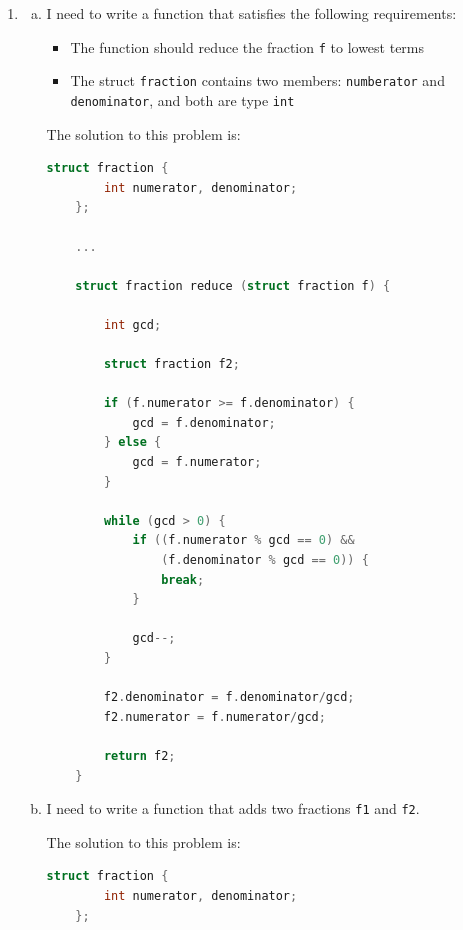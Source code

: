 \documentclass[12pt]{article}
\begin{document}
\begin{enumerate}[1.]
    \item

    \begin{enumerate}[a)]
        \item

        I need to write a function that satisfies the following requirements:

        \begin{itemize}
            \item The function should reduce the fraction \texttt{f} to lowest terms
            \item The struct \texttt{fraction} contains two members: \texttt{numberator} and \texttt{denominator}, and
            both are type \texttt{int}
        \end{itemize}

        \bigskip

        The solution to this problem is:

        \bigskip

\begin{lstlisting}[language=c]
    struct fraction {
        int numerator, denominator;
    };

    ...

    struct fraction reduce (struct fraction f) {

        int gcd;

        struct fraction f2;

        if (f.numerator >= f.denominator) {
            gcd = f.denominator;
        } else {
            gcd = f.numerator;
        }

        while (gcd > 0) {
            if ((f.numerator % gcd == 0) &&
                (f.denominator % gcd == 0)) {
                break;
            }

            gcd--;
        }

        f2.denominator = f.denominator/gcd;
        f2.numerator = f.numerator/gcd;

        return f2;
    }
\end{lstlisting}

        \item

        I need to write a function that adds two fractions \texttt{f1} and \texttt{f2}.

        \bigskip

        The solution to this problem is:

\begin{lstlisting}[language=c]
    struct fraction {
        int numerator, denominator;
    };


\end{lstlisting}
\end{enumerate}
\end{enumerate}
\end{document}
